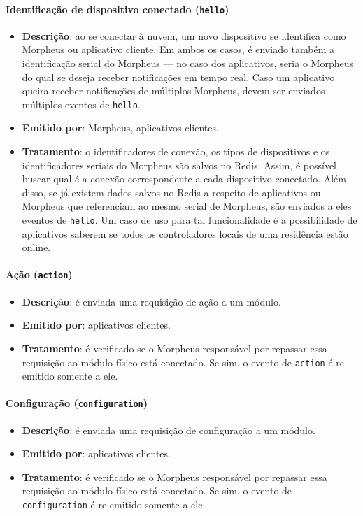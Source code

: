 \paragraph{Identificação de dispositivo conectado (\texttt{hello})}
\begin{itemize}
\item \textbf{Descrição}: ao se conectar à nuvem, um novo dispositivo se identifica como Morpheus ou aplicativo cliente. Em ambos os casos, é enviado também a identificação serial do Morpheus --- no caso dos aplicativos, seria o Morpheus do qual se deseja receber notificações em tempo real. Caso um aplicativo queira receber notificações de múltiplos Morpheus, devem ser enviados múltiplos eventos de \texttt{hello}.
\item \textbf{Emitido por}: Morpheus, aplicativos clientes.
\item \textbf{Tratamento}: o identificadores de conexão, os tipos de dispositivos e os identificadores seriais do Morpheus são salvos no Redis. Assim, é possível buscar qual é a conexão correspondente a cada dispositivo conectado.
Além disso, se já existem dados salvos no Redis a respeito de aplicativos ou Morpheus que referenciam ao mesmo serial de Morpheus, são enviados a eles eventos de \texttt{hello}. Um caso de uso para tal funcionalidade é a possibilidade de aplicativos saberem se todos os controladores locais de uma residência estão online.
\end{itemize}

\paragraph{Ação (\texttt{action})}
\begin{itemize}
\item \textbf{Descrição}: é enviada uma requisição de ação a um módulo.
\item \textbf{Emitido por}: aplicativos clientes.
\item \textbf{Tratamento}: é verificado se o Morpheus responsável por repassar essa requisição ao módulo físico está conectado. Se sim, o evento de \texttt{action} é re-emitido somente a ele.
\end{itemize}

\paragraph{Configuração (\texttt{configuration})}
\begin{itemize}
\item \textbf{Descrição}: é enviada uma requisição de configuração a um módulo.
\item \textbf{Emitido por}: aplicativos clientes.
\item \textbf{Tratamento}: é verificado se o Morpheus responsável por repassar essa requisição ao módulo físico está conectado. Se sim, o evento de \texttt{configuration} é re-emitido somente a ele.
\end{itemize}

